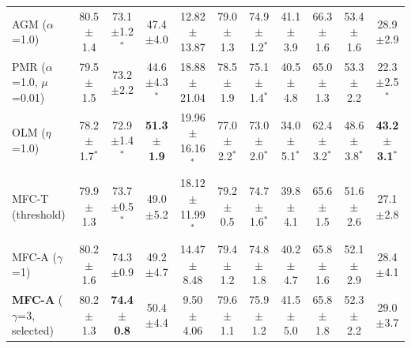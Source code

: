 \documentclass[fleqn,10pt]{wlscirep}
\begin{document}
\begin{table}[t]
\begin{tabular}{@{}lcccccccccc@{}}
AGM ($\alpha$=1.0) & 80.5$\pm$1.4 & 73.1$\pm$1.2$^{*}$ & 47.4$\pm$4.0 & 12.82$\pm$13.87 & 79.0$\pm$1.3 & 74.9$\pm$1.2$^{*}$ & 41.1$\pm$3.9 & 66.3$\pm$1.6 & 53.4$\pm$1.6 & 28.9$\pm$2.9 \\
PMR ($\alpha$=1.0, $\mu$=0.01) & 79.5$\pm$1.5 & 73.2$\pm$2.2 & 44.6$\pm$4.3$^{*}$ & 18.88$\pm$21.04 & 78.5$\pm$1.9 & 75.1$\pm$1.4$^{*}$ & 40.5$\pm$4.8 & 65.0$\pm$1.3 & 53.3$\pm$2.2 & 22.3$\pm$2.5$^{*}$ \\
OLM ($\eta$=1.0) & 78.2$\pm$1.7$^{*}$ & 72.9$\pm$1.4$^{*}$ & \textbf{51.3$\pm$1.9} & 19.96$\pm$16.16$^{*}$ & 77.0$\pm$2.2$^{*}$ & 73.0$\pm$2.0$^{*}$ & 34.0$\pm$5.1$^{*}$ & 62.4$\pm$3.2$^{*}$ & 48.6$\pm$3.8$^{*}$ & \textbf{43.2$\pm$3.1$^{*}$} \\
MFC-T (threshold) & 79.9$\pm$1.3 & 73.7$\pm$0.5$^{*}$ & 49.0$\pm$5.2 & 18.12$\pm$11.99$^{*}$ & 79.2$\pm$0.5 & 74.7$\pm$1.6$^{*}$ & 39.8$\pm$4.1 & 65.6$\pm$1.5 & 51.6$\pm$2.6 & 27.1$\pm$2.8 \\
MFC-A ($\gamma$=1) & 80.2$\pm$1.6 & 74.3$\pm$0.9 & 49.2$\pm$4.7 & 14.47$\pm$8.48 & 79.4$\pm$1.2 & 74.8$\pm$1.8 & 40.2$\pm$4.7 & 65.8$\pm$1.6 & 52.1$\pm$2.9 & 28.4$\pm$4.1 \\
\textbf{MFC-A} ($\gamma$=3, selected) & 80.2$\pm$1.3 & \textbf{74.4$\pm$0.8} & 50.4$\pm$4.4 & 9.50$\pm$4.06 & 79.6$\pm$1.1 & 75.9$\pm$1.2 & 41.5$\pm$5.0 & 65.8$\pm$1.8 & 52.3$\pm$2.2 & 29.0$\pm$3.7 \\
\bottomrule
\end{tabular}
\end{table}
\end{document}
